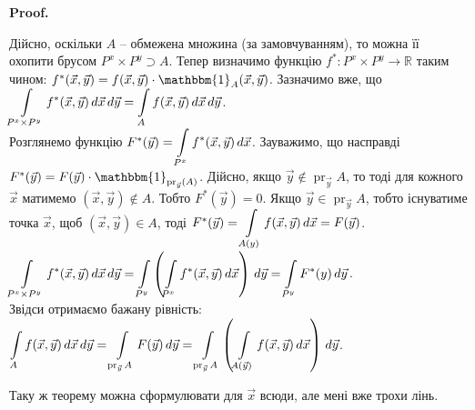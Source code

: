 \documentclass[a4paper, 10pt]{article}
\makeatletter
\def\qed{$\blacksquare$}
\theoremstyle{theoremdd}
\theoremstyle{theoremdd}
\theoremstyle{theoremdd}
\theoremstyle{theoremdd}
\theoremstyle{theoremdd}
\theoremstyle{theoremdd}
\theoremstyle{theoremdd}
\theoremstyle{theoremdd}
\theoremstyle{theoremdd}
\theoremstyle{theoremdd}
\theoremstyle{theoremdd}
\theoremstyle{theoremdd}
\theoremstyle{theoremdd}
\theoremstyle{theoremdd}
\theoremstyle{theoremdd}
\renewenvironment{proof}[1][Proof.\\]{\par
\pushQED{\hfill \qed}%
\normalfont \topsep6\p@\@plus6\p@\relax
\trivlist
\item\relax
{\bfseries
#1\@addpunct{.}}\hspace\labelsep\ignorespaces
}{%
\popQED\endtrivlist\@endpefalse
}
\DeclareMathOperator{\pr}{pr}
\makeatother
\begin{document}
\begin{proof}
Дійсно, оскільки $A$ -- обмежена множина (за замовчуванням), то можна її охопити брусом $P^x \times P^y \supset A$. Тепер визначимо функцію $f^* \colon P^x \times P^y \to \mathbb{R}$ таким чином: $f^*(\vec{x},\vec{y}) = f(\vec{x},\vec{y}) \cdot \mathbbm{1}_{A}(\vec{x},\vec{y})$. Зазначимо вже, що $\displaystyle\int\displaylimits_{P^x \times P^y} f^*(\vec{x},\vec{y})\,d\vec{x}\,d\vec{y} = \int\displaylimits_A f(\vec{x},\vec{y})\,d\vec{x}\,d\vec{y}$.\\
Розглянемо функцію $F^*(\vec{y}) = \displaystyle\int\displaylimits_{P^x} f^*(\vec{x},\vec{y})\,d\vec{x}$. Зауважимо, що насправді $F^*(\vec{y}) = F(\vec{y}) \cdot \mathbbm{1}_{\pr_{\vec{y}}(A)}$. Дійсно, якщо $\vec{y} \notin \pr_{\vec{y}}A$, то тоді для кожного $\vec{x}$ матимемо $(\vec{x},\vec{y}) \notin A$. Тобто $F^*(\vec{y}) = 0$. Якщо $\vec{y} \in \pr_{\vec{y}} A$, тобто існуватиме точка $\vec{x}$, щоб $(\vec{x},\vec{y}) \in A$, тоді $F^*(\vec{y}) = \displaystyle\int\displaylimits_{A(y)} f(\vec{x},\vec{y})\,d\vec{x} = F(\vec{y})$. \\
$\displaystyle\int\displaylimits_{P^x \times P^y} f^*(\vec{x},\vec{y})\,d\vec{x}\,d\vec{y} = \int\displaylimits_{P^y} \left( \int\displaylimits_{P^x} f^*(\vec{x},\vec{y})\,d\vec{x} \right)\,d\vec{y} = \int\displaylimits_{P^y} F^*(y)\,d\vec{y}$.\\
Звідси отримаємо бажану рівність:\\
$\displaystyle\int\displaylimits_A f(\vec{x},\vec{y})\,d\vec{x}\,d\vec{y} = \int\displaylimits_{\pr_{\vec{y}} A} F(\vec{y})\,d\vec{y} = \int\displaylimits_{\pr_{\vec{y}} A} \left(\int\displaylimits_{A(\vec{y})} f(\vec{x},\vec{y}) \,d\vec{x} \right)\,d\vec{y}$.
\end{proof}

Таку ж теорему можна сформулювати для $\vec{x}$ всюди, але мені вже трохи лінь.
\end{document}
